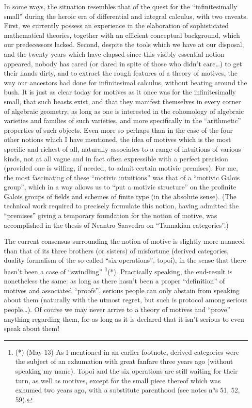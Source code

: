 In some ways, the situation resembles that of the quest for the ``infinitesimally small''
during the heroic era of differential and integral calculus, with two caveats.
First, we currently possess an experience in the elaboration of sophisticated mathematical
theories, together with an efficient conceptual background, which our predecessors lacked. 
Second, despite the tools which we have at our disposal,
and the twenty years which have elapsed since this visibly essential notion appeared,
nobody has cared (or dared in spite of those who didn't care\ldots) to get their hands dirty,
and to extract the rough features of a theory of motives, the way our ancestors had done
for infinitesimal calculus, without beating around the bush.
It is just as clear today for motives as it once was for the infinitesimally small, that
such beasts exist, and that they manifest themselves in every corner of algebraic
geometry, as long as one is interested in the cohomology of algebraic varieties and 
families of such varieties, and more specifically in the ``arithmetic'' properties of
such objects. 
Even more so perhaps than in the case of the four other notions which I have mentioned, the
idea of motives which is the most specific and richest of all, naturally associates to a
range of intuitions of various kinds, not at all vague and in fact often 
expressible with a perfect precision (provided one is willing, if needed, to admit certain motivic
premises). For me, the most fascinating of these ``motivic intuitions'' was that of
a ``motivic Galois group'', which in a way allows us to ``put a motivic structure'' 
on the profinite Galois groups of fields and schemes of finite type (in the absolute
sense).
(The technical work required to precisely formulate this notion, 
having admitted the ``premises'' giving a temporary foundation for the notion of motive,
was accomplished in the thesis of Neantro Saavedra on ``Tannakian categories''.)

The current consensus surrounding the notion of motive is slightly more nuanced than 
that of its three brothers (or sisters)
of misfortune (derived categories, duality formalism of the so-called
``six-operations'', topoi), 
in the sense that there hasn't been a case of ``swindling''
\footnote{(*) (May 13) As I mentioned in an earlier footnote, derived categories were the subject of an exhumation with great fanfare three years ago (without speaking my name). Topoi and the six operations are still waiting for their turn, as well as motives, except for the small piece thereof which was exhumed two years ago, with a substitute parenthood (see notes n$^o$s 51, 52, 59).}(*). 
Practically speaking, the end-result is nonetheless the same: as long as there hasn't been
a proper ``definition'' of motives and associated ``proofs'', serious people can only
abstain from speaking about them
(naturally with the utmost regret, but such is protocol among serious people\ldots).
Of course we may never arrive to a theory of motives and ``prove'' anything regarding them,
for as long as it is declared that it isn't serious to even speak about them! 

